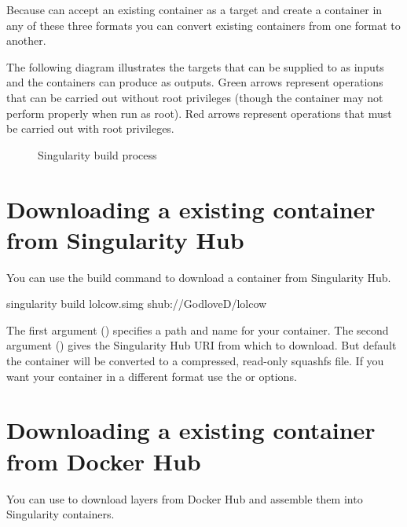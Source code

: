 \documentclass[letterpaper,10pt,english]{sphinxmanual}
\begin{document}
Because  can accept an existing container as a target and create a
container in any of these three formats you can convert existing
containers from one format to another.

The following diagram illustrates the targets that can be supplied to 
as inputs and the containers  can produce as outputs. Green arrows
represent operations that can be carried out without root privileges
(though the container may not perform properly when run as root). Red
arrows represent operations that must be carried out with root
privileges.

\begin{figure}[htbp]
\centering
\capstart

\noindent{}
\caption{Singularity build process}\label{\detokenize{build_a_container:id2}}\end{figure}


\section{Downloading a existing container from Singularity Hub}
\label{\detokenize{build_a_container:downloading-a-existing-container-from-singularity-hub}}
You can use the build command to download a container from Singularity
Hub.

%
\begin{sphinxVerbatim}[commandchars=\\\{\}]
\PYGZdl{} singularity build lolcow.simg shub://GodloveD/lolcow
\end{sphinxVerbatim}

The first argument () specifies a path and name for your container.
The second argument () gives the Singularity Hub URI from which to download.
But default the container will be converted to a compressed, read-only
squashfs file. If you want your container in a different format use
the  or  options.


\section{Downloading a existing container from Docker Hub}
\label{\detokenize{build_a_container:downloading-a-existing-container-from-docker-hub}}
You can use  to download layers from Docker Hub and assemble them into
Singularity containers.
\end{document}
